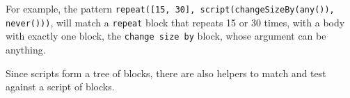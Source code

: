 \documentclass[../main]{subfiles}
\begin{document}
For example, the pattern \texttt{repeat([15, 30], script(changeSizeBy(any()), never()))}, will match a \texttt{repeat} block that repeats 15 or 30 times, with a body with exactly one block, the \texttt{change size by} block, whose argument can be anything.

Since scripts form a tree of blocks, there are also helpers to match and test against a script of blocks.



%
%
%
%
%

%
%
%
\end{document}
